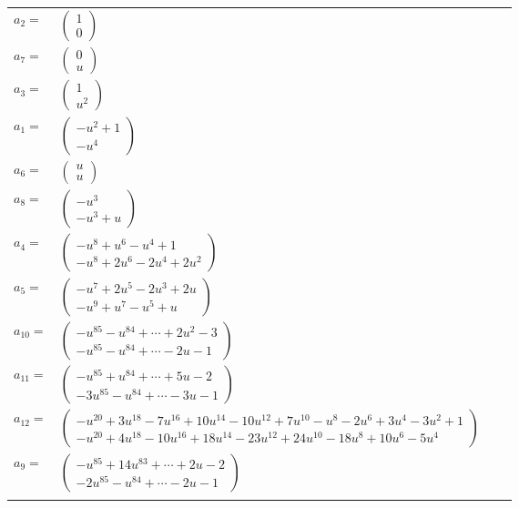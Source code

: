 \documentclass[1p]{elsarticle_modified}
\theoremstyle{definition}
\begin{document}
\begin{tabular}{m{7pt} m{180pt} m{7pt} m{180pt} }
\flushright $a_{2}=$&$\begin{pmatrix}1\\0\end{pmatrix}$ \\
\flushright $a_{7}=$&$\begin{pmatrix}0\\u\end{pmatrix}$ \\
\flushright $a_{3}=$&$\begin{pmatrix}1\\u^2\end{pmatrix}$ \\
\flushright $a_{1}=$&$\begin{pmatrix}- u^2+1\\- u^4\end{pmatrix}$ \\
\flushright $a_{6}=$&$\begin{pmatrix}u\\u\end{pmatrix}$ \\
\flushright $a_{8}=$&$\begin{pmatrix}- u^3\\- u^3+u\end{pmatrix}$ \\
\flushright $a_{4}=$&$\begin{pmatrix}- u^8+u^6- u^4+1\\- u^8+2 u^6-2 u^4+2 u^2\end{pmatrix}$ \\
\flushright $a_{5}=$&$\begin{pmatrix}- u^7+2 u^5-2 u^3+2 u\\- u^9+u^7- u^5+u\end{pmatrix}$ \\
\flushright $a_{10}=$&$\begin{pmatrix}- u^{85}- u^{84}+\cdots+2 u^2-3\\- u^{85}- u^{84}+\cdots-2 u-1\end{pmatrix}$ \\
\flushright $a_{11}=$&$\begin{pmatrix}- u^{85}+u^{84}+\cdots+5 u-2\\-3 u^{85}- u^{84}+\cdots-3 u-1\end{pmatrix}$ \\
\flushright $a_{12}=$&$\begin{pmatrix}- u^{20}+3 u^{18}-7 u^{16}+10 u^{14}-10 u^{12}+7 u^{10}- u^8-2 u^6+3 u^4-3 u^2+1\\- u^{20}+4 u^{18}-10 u^{16}+18 u^{14}-23 u^{12}+24 u^{10}-18 u^8+10 u^6-5 u^4\end{pmatrix}$ \\
\flushright $a_{9}=$&$\begin{pmatrix}- u^{85}+14 u^{83}+\cdots+2 u-2\\-2 u^{85}- u^{84}+\cdots-2 u-1\end{pmatrix}$\\&\end{tabular}
\end{document}
